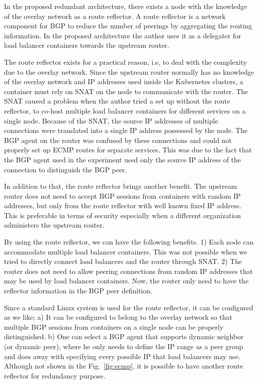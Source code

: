 %
In the proposed redundant architecture, there exists a node with the knowledge of the overlay network as a route reflector.
A route reflector is a network component for BGP to reduce the number of peerings by aggregating the routing information\cite{rfc4456}.
In the proposed architecture the author uses it as a delegater for load balancer containers towards the upstream router.

The route reflector exists for a practical reason, i.e, to deal with the complexity due to the overlay network.
Since the upstream router normally has no knowledge of the overlay network and IP addresses used inside the Kubernetes clusters, a container must rely on SNAT on the node to communicate with the router.
The SNAT caused a problem when the author tried a set up without the route reflector, to co-host multiple load balancer containers for different services on a single node.
Because of the SNAT, the source IP addresses of multiple connections were translated into a single IP address possessed by the node.
The BGP agent on the router was confused by these connections and could not properly set up ECMP routes for separate services.
This was due to the fact that the BGP agent used in the experiment used only the source IP address of the connection to distinguish the BGP peer.

In addition to that, the route reflector brings another benefit.
The upstream router does not need to accept BGP sessions from containers with random IP addresses, but only from the route reflector with well known fixed IP address.
This is preferable in terms of security especially when a different organization administers the upstream router.

By using the route reflector, we can have the following benefits.
1) Each node can accommodate multiple load balancer containers. This was not possible when we tried to directly connect load balancers and the router through SNAT.
2) The router does not need to allow peering connections from random IP addresses that may be used by load balancer containers. Now, the router only need to have the reflector information in the BGP peer definition.

Since a standard Linux system is used for the route reflector, it can be configured as we like;
a) It can be configured to belong to the overlay network so that multiple BGP sessions from containers on a single node can be properly distinguished.
b) One can select a BGP agent that supports dynamic neighbor (or dynamic peer), where he only needs to define the IP range as a peer group and does away with specifying every possible IP that load balancers may use.
Although not shown in the Fig.~\ref{fig:ecmp}, it is possible to have another route reflector for redundancy purpose.

\FloatBarrier


